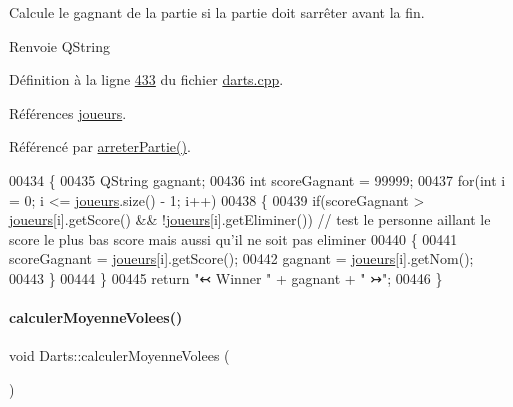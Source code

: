 Calcule le gagnant de la partie si la partie doit s\textquotesingle{}arrêter avant la fin. 

\begin{DoxyReturn}{Renvoie}
Q\+String 
\end{DoxyReturn}


Définition à la ligne \hyperlink{darts_8cpp_source_l00433}{433} du fichier \hyperlink{darts_8cpp_source}{darts.\+cpp}.



Références \hyperlink{darts_8h_source_l00073}{joueurs}.



Référencé par \hyperlink{darts_8cpp_source_l00422}{arreter\+Partie()}.


\begin{DoxyCode}
00434 \{
00435     QString gagnant;
00436     \textcolor{keywordtype}{int} scoreGagnant = 99999;
00437     \textcolor{keywordflow}{for}(\textcolor{keywordtype}{int} i = 0; i <= \hyperlink{class_darts_a81bc116f3ae70cea1f492f87f01901c7}{joueurs}.size() - 1; i++)
00438     \{
00439         \textcolor{keywordflow}{if}(scoreGagnant > \hyperlink{class_darts_a81bc116f3ae70cea1f492f87f01901c7}{joueurs}[i].getScore() && !\hyperlink{class_darts_a81bc116f3ae70cea1f492f87f01901c7}{joueurs}[i].getEliminer()) \textcolor{comment}{// test le
       personne aillant le score le plus bas score mais aussi qu'il ne soit pas eliminer}
00440         \{
00441             scoreGagnant = \hyperlink{class_darts_a81bc116f3ae70cea1f492f87f01901c7}{joueurs}[i].getScore();
00442             gagnant = \hyperlink{class_darts_a81bc116f3ae70cea1f492f87f01901c7}{joueurs}[i].getNom();
00443         \}
00444     \}
00445     \textcolor{keywordflow}{return} \textcolor{stringliteral}{"↢  Winner "} + gagnant + \textcolor{stringliteral}{"  ↣"};
00446 \}
\end{DoxyCode}
\mbox{\label{class_darts_af87b6a1cd30838b99379aa4061fc43cc}} 
\paragraph{\texorpdfstring{calculer\+Moyenne\+Volees()}{calculerMoyenneVolees()}}
{\footnotesize\ttfamily void Darts\+::calculer\+Moyenne\+Volees (\begin{DoxyParamCaption}{ }\end{DoxyParamCaption})\hspace{0.3cm}{\ttfamily [private]}}



